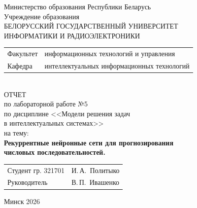\begin{titlepage}
	\begin{center}
		Министерство образования Республики Беларусь\\[1em]
		Учреждение образования\\
		БЕЛОРУССКИЙ ГОСУДАРСТВЕННЫЙ УНИВЕРСИТЕТ \\
		ИНФОРМАТИКИ И РАДИОЭЛЕКТРОНИКИ\\[1em]
		
		\begin{minipage}{\textwidth}
			\begin{flushleft}
				\begin{tabular}{ l l }
					Факультет & информационных технологий и управления\\
					Кафедра   & интеллектуальных информационных технологий
				\end{tabular}
			\end{flushleft}
		\end{minipage}\\[1em]
		
		{ОТЧЕТ}\\
		{по лабораторной работе №5}\\
		{по дисциплине <<Модели решения задач}\\
		{в интеллектуальных системах>>}\\
		{на тему:}\\[1em]
		\textbf{Рекуррентные нейронные сети для прогнозирования}\\
		\textbf{числовых последовательностей.}\\[1em]
		
		\vspace{2em}
		\begin{tabular}{ p{}p{} }
			Студент гр. 321701 & И.\,А.~Политыко \\
			Руководитель & В.\,П.~Ивашенко \\
		\end{tabular}
		
		\vfill
		{\normalsize Минск 2026}
	\end{center}
\end{titlepage}
